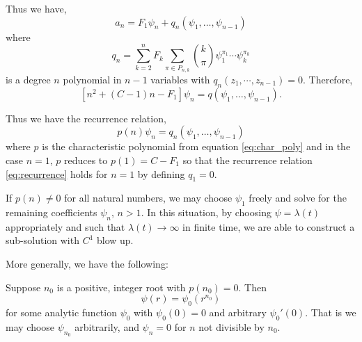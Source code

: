 \documentclass{amsart}
\begin{document}
Thus we have,
\[
a_n = F_1 \psi_n + q_n(\psi_1, \dots, \psi_{n-1})
\]
where
\[
q_n = \sum_{k=2}^n F_k \sum_{\pi \in P_{n,k}} {k \choose \pi} \psi_1^{\pi_1} \cdots \psi_k^{\pi_k}
\]
is a degree \(n\) polynomial in \(n-1\) variables with \(q_n(z_1, \cdots, z_{n-1}) = 0\). Therefore,
\[
\left[n^2 + (C-1) n - F_1\right] \psi_n =  q(\psi_1, \dots, \psi_{n-1}).
\]

Thus we have the recurrence relation,
\begin{equation}
\label{eq:recurrence}
p(n) \psi_n = q_n (\psi_1, \dots, \psi_{n-1})
\end{equation}
where \(p\) is the characteristic polynomial from equation \eqref{eq:char_poly} and in the case \(n=1\), \(p\) reduces to \(p(1) = C - F_1\) so that the recurrence relation \eqref{eq:recurrence} holds for \(n=1\) by defining \(q_1 = 0\).

If \(p(n) \ne 0\) for all natural numbers, we may choose \(\psi_1\) freely and solve for the remaining coefficients \(\psi_n\), \(n > 1\). In this situation, by choosing \(\psi = \lambda(t)\) appropriately and such that \(\lambda(t) \to \infty\) in finite time, we are able to construct a sub-solution with \(C^1\) blow up.

More generally, we have the following:

\begin{lemma}
\label{lem:heuristic_asymptotics}
Suppose \(n_0\) is a positive, integer root with \(p(n_0) = 0\). Then
\[
\psi(r) = \psi_0(r^{n_0})
\]
for some analytic function \(\psi_0\) with \(\psi_0(0) = 0\) and arbitrary \(\psi_0'(0)\). That is we may choose \(\psi_{n_0}\) arbitrarily, and \(\psi_n = 0\) for \(n\) not divisible by \(n_0\).
\end{lemma}
\end{document}
